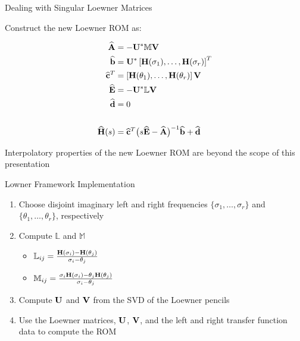 \begin{frame}{Dealing with Singular Loewner Matrices}

Construct the new Loewner ROM as:

\begin{align*}
    {\bf \widehat{A} } & = {\bf-U^*\mathbb{M}V}\\
    {\bf \widehat{b} } & = {\bf U^*} \left[{\bf H}(\sigma_1), \dots, {\bf H}(\sigma_r) \right]^T\\
    {\bf \widehat{c}}^T & = \left[{\bf H}(\theta_1), \dots, {\bf H}(\theta_r) \right]{\bf V} \\
    {\bf \widehat{E} } & = {\bf -U^*\mathbb{L} V}\\
    {\bf \widehat{d} } & = 0 \\ \\
    {\bf \widehat{H}}(s) & = {\bf \widehat{c}}^T \big( s{\bf \widehat{E}}-{\bf \widehat{A}} \big)^{-1} {\bf \widehat{b}} + {\bf \widehat{d}}
\end{align*}
    
Interpolatory properties of the new Loewner ROM are beyond the scope of this presentation    
\end{frame}
\begin{frame}{Lowner Framework Implementation}

\begin{enumerate}
    \item Choose disjoint imaginary left and right frequencies $\{\sigma_1, \dots, \sigma_r\}$ and $\{\theta_1, \dots, \theta_r\}$, respectively
    \item Compute $\mathbb{L}$ and $\mathbb{M}$
    \begin{itemize}
        \item $\mathbb{L}_{ij} =  \frac{{\bf H}(\sigma_i)-{\bf H}(\theta_j)}{\sigma_i - \theta_j}$
        \item $\mathbb{M}_{ij} = \frac{\sigma_i{\bf H}(\sigma_i)-\theta_j{\bf H}(\theta_j)}{\sigma_i - \theta_j}$
    \end{itemize}
    \item Compute $\bf U$ and $\bf V$ from the SVD of the Loewner pencils
    \item Use the Loewner matrices, $\bf U$, $\bf V$, and the left and right transfer function data to compute the ROM  
\end{enumerate}


\end{frame}
